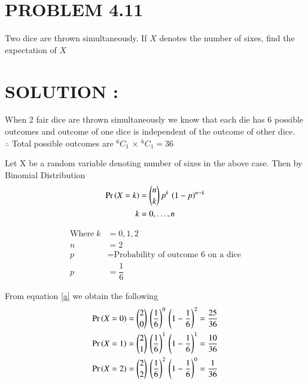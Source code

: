 \documentclass[journal,12pt,twocolumn]{IEEEtran}
\begin{document}
\section*{PROBLEM 4.11}
Two dice are thrown simultaneously. If $X$ denotes the number of sixes, find the
expectation of $X$
\section*{SOLUTION :}
 When 2 fair dice are thrown simultaneously we know that each die has 6 possible 
 outcomes and outcome of one dice is independent of the outcome of other dice.
 \\$\therefore$ Total possible outcomes are $^{6}C_{1}\,\times\,^{6}C_{1}=36$
 \null \par \null
Let X be a random variable denoting number of sixes in the above case. Then by Binomial
Distribution 
\begin{align}
    \Pr\left(X=k\right)&=\binom{n}{k}\,p^k\,\left(1-p\right)^{n-k} \label{a} \\
    k&=0,\dots,n \label{b}
\end{align}

\begin{align*}
\text{Where}\;k &= 0,1,2\\
              n &= 2 \\
              p &= \text{Probability of outcome 6 on a dice} \\
              p &= \dfrac{1}{6}
\end{align*}
\null \par \null
From equation \eqref{a} we obtain the following
\newpage
\begin{align*}
\Pr\left(X=0\right) &= \binom{2}{0}\,\left(\dfrac{1}{6}\right)^{0}\,\left(1-\dfrac{1}{6}\right)^{2} =\dfrac{25}{36} \\
\Pr\left(X=1\right) &= \binom{2}{1}\,\left(\dfrac{1}{6}\right)^{1}\,\left(1-\dfrac{1}{6}\right)^{1} =\dfrac{10}{36} \\
\Pr\left(X=2\right) &= \binom{2}{2}\,\left(\dfrac{1}{6}\right)^{2}\,\left(1-\dfrac{1}{6}\right)^{0} =\dfrac{1}{36} \\
\end{align*}
\end{document}
